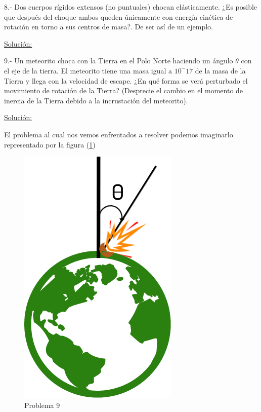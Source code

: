 \documentclass[a4paper,10pt]{article}
\begin{document}
\vspace{.3cm}

8.- Dos cuerpos rígidos extensos (no puntuales) chocan elásticamente. ¿Es posible que 
después del choque ambos queden únicamente con energía cinética de rotación en torno 
a sus centros de masa?. De ser así de un ejemplo.
\vspace{.3cm}

\underline{Solución:}

\vspace{.3cm}

9.- Un meteorito choca con la Tierra en el Polo Norte haciendo un ángulo $\theta$ con
el eje de la tierra. El meteorito tiene una masa igual a $10^-17$ de la masa de la 
Tierra y llega con la velocidad de escape. ¿En qué forma se verá perturbado el movimiento
de rotación de la Tierra? (Desprecie el cambio en el momento de inercia de la Tierra
debido a la incrustación del meteorito).
\vspace{.3cm}

\underline{Solución:}\vspace{.3cm}

El problema al cual nos vemos enfrentados a resolver podemos imaginarlo representado
por la figura (\ref{fig:problema9})


\begin{figure}[ht]
 \centering
\includegraphics[scale=0.3]{problema9fig1}
\caption{Problema 9}
\label{fig:problema9}
\end{figure}
\end{document}

